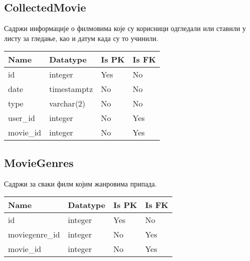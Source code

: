\subsection{CollectedMovie}

Садржи информације о филмовима које су корисници одгледали или ставили у листу за гледање, као и датум када су то учинили.

\vspace{0.5cm}

\noindent
\setcellgapes{4pt}
\makegapedcells
\begin{tabularx}{\linewidth}{|X|X|X|X|}
    \hline
    \textbf{Name} & \textbf{Datatype} & \textbf{Is PK} & \textbf{Is FK} \\
    \hline
    id & integer & Yes & No \\
    \hline
    date & timestamptz & No & No \\
    \hline
    type & varchar(2) & No & No \\
    \hline
    user\_id & integer & No & Yes \\
    \hline
    movie\_id & integer & No & Yes \\
    \hline
\end{tabularx}

\subsection{MovieGenres}

Садржи за сваки филм којим жанровима припада.

\vspace{0.5cm}

\noindent
\setcellgapes{4pt}
\makegapedcells
\begin{tabularx}{\linewidth}{|X|X|X|X|}
    \hline
    \textbf{Name} & \textbf{Datatype} & \textbf{Is PK} & \textbf{Is FK} \\
    \hline
    id & integer & Yes & No \\
    \hline
    moviegenre\_id & integer & No & Yes \\
    \hline
    movie\_id & integer & No & Yes \\
    \hline
\end{tabularx}